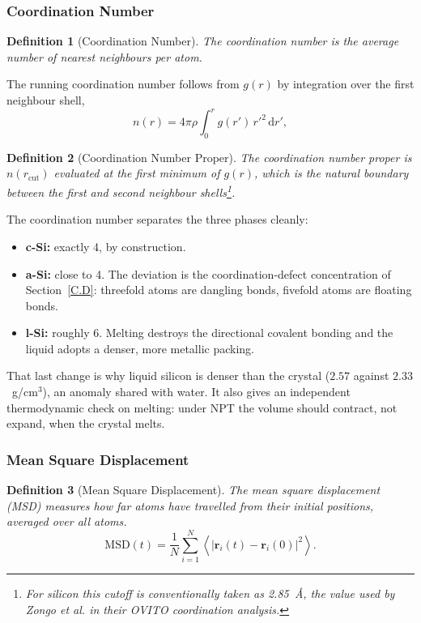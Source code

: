 \documentclass{article}
\newtheorem{definition}{Definition}
\begin{document}
\subsubsection{Coordination Number}
\label{CN}
\begin{definition}[Coordination Number]
    The coordination number is the average number of nearest neighbours per atom.
\end{definition}

The running coordination number follows from $g(r)$ by integration over the first neighbour shell,
\begin{equation}
    n(r) = 4\pi \rho \int_{0}^{r} g(r')\, r'^{2}\, \mathrm{d}r',
    \label{eq:coord}
\end{equation}
\begin{definition}[Coordination Number Proper]
    The coordination number proper is $n(r_{\text{cut}})$ evaluated at the first minimum of $g(r)$, which is the natural boundary between the first and second neighbour shells\footnote{For silicon this cutoff is conventionally taken as 2.85~\AA, the value used by Zongo et al. in their OVITO coordination analysis.}.
\end{definition}

The coordination number separates the three phases cleanly:
\begin{itemize}
    \item \textbf{c-Si:} exactly 4, by construction.
    \item \textbf{a-Si:} close to 4. The deviation is the coordination-defect concentration of Section~\ref{C.D}: threefold atoms are dangling bonds, fivefold atoms are floating bonds.
    \item \textbf{l-Si:} roughly 6. Melting destroys the directional covalent bonding and the liquid adopts a denser, more metallic packing.
\end{itemize}
That last change is why liquid silicon is denser than the crystal ($2.57$ against $2.33$~g/cm$^3$), an anomaly shared with water. It also gives an independent thermodynamic check on melting: under NPT the volume should contract, not expand, when the crystal melts.

\subsubsection{Mean Square Displacement}
\label{MSD}
\begin{definition}[Mean Square Displacement]
    The mean square displacement (MSD) measures how far atoms have travelled from their initial positions, averaged over all atoms.
    \begin{equation}
        \text{MSD}(t) = \frac{1}{N}\sum_{i=1}^{N} \left\langle \left| \mathbf{r}_i(t) - \mathbf{r}_i(0) \right|^{2} \right\rangle.
        \label{eq:msd}
    \end{equation}
\end{definition}
\end{document}
